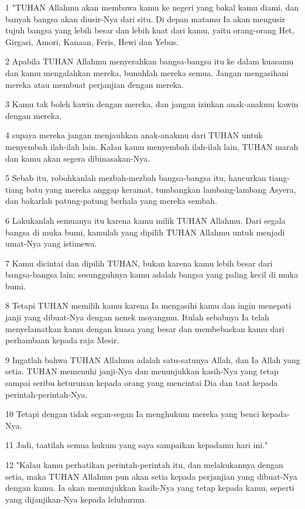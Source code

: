 \par 1 "TUHAN Allahmu akan membawa kamu ke negeri yang bakal kamu diami, dan banyak bangsa akan diusir-Nya dari situ. Di depan matamu Ia akan mengusir tujuh bangsa yang lebih besar dan lebih kuat dari kamu, yaitu orang-orang Het, Girgasi, Amori, Kanaan, Feris, Hewi dan Yebus.
\par 2 Apabila TUHAN Allahmu menyerahkan bangsa-bangsa itu ke dalam kuasamu dan kamu mengalahkan mereka, bunuhlah mereka semua. Jangan mengasihani mereka atau membuat perjanjian dengan mereka.
\par 3 Kamu tak boleh kawin dengan mereka, dan jangan izinkan anak-anakmu kawin dengan mereka,
\par 4 supaya mereka jangan menjauhkan anak-anakmu dari TUHAN untuk menyembah ilah-ilah lain. Kalau kamu menyembah ilah-ilah lain, TUHAN marah dan kamu akan segera dibinasakan-Nya.
\par 5 Sebab itu, robohkanlah mezbah-mezbah bangsa-bangsa itu, hancurkan tiang-tiang batu yang mereka anggap keramat, tumbangkan lambang-lambang Asyera, dan bakarlah patung-patung berhala yang mereka sembah.
\par 6 Lakukanlah semuanya itu karena kamu milik TUHAN Allahmu. Dari segala bangsa di muka bumi, kamulah yang dipilih TUHAN Allahmu untuk menjadi umat-Nya yang istimewa.
\par 7 Kamu dicintai dan dipilih TUHAN, bukan karena kamu lebih besar dari bangsa-bangsa lain; sesungguhnya kamu adalah bangsa yang paling kecil di muka bumi.
\par 8 Tetapi TUHAN memilih kamu karena Ia mengasihi kamu dan ingin menepati janji yang dibuat-Nya dengan nenek moyangmu. Itulah sebabnya Ia telah menyelamatkan kamu dengan kuasa yang besar dan membebaskan kamu dari perhambaan kepada raja Mesir.
\par 9 Ingatlah bahwa TUHAN Allahmu adalah satu-satunya Allah, dan Ia Allah yang setia. TUHAN memenuhi janji-Nya dan menunjukkan kasih-Nya yang tetap sampai seribu keturunan kepada orang yang mencintai Dia dan taat kepada perintah-perintah-Nya.
\par 10 Tetapi dengan tidak segan-segan Ia menghukum mereka yang benci kepada-Nya.
\par 11 Jadi, taatilah semua hukum yang saya sampaikan kepadamu hari ini."
\par 12 "Kalau kamu perhatikan perintah-perintah itu, dan melakukannya dengan setia, maka TUHAN Allahmu pun akan setia kepada perjanjian yang dibuat-Nya dengan kamu. Ia akan menunjukkan kasih-Nya yang tetap kepada kamu, seperti yang dijanjikan-Nya kepada leluhurmu.
